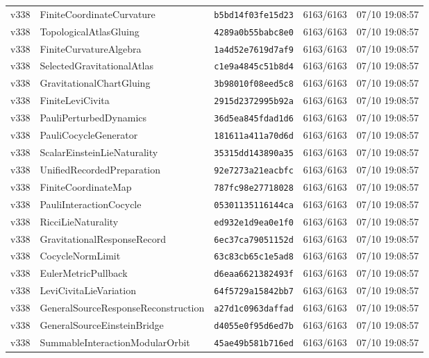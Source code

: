 \documentclass[11pt]{article}
\theoremstyle{definition}\newtheorem{deriv}{Derivação}
\begin{document}
{\begin{longtable}{@{}lllll@{}}
v338 & FiniteCoordinateCurvature & \texttt{b5bd14f03fe15d23} & 6163/6163 & 07/10 19:08:57 \\
v338 & TopologicalAtlasGluing & \texttt{4289a0b55babc8e0} & 6163/6163 & 07/10 19:08:57 \\
v338 & FiniteCurvatureAlgebra & \texttt{1a4d52e7619d7af9} & 6163/6163 & 07/10 19:08:57 \\
v338 & SelectedGravitationalAtlas & \texttt{c1e9a4845c51b8d4} & 6163/6163 & 07/10 19:08:57 \\
v338 & GravitationalChartGluing & \texttt{3b98010f08eed5c8} & 6163/6163 & 07/10 19:08:57 \\
v338 & FiniteLeviCivita & \texttt{2915d2372995b92a} & 6163/6163 & 07/10 19:08:57 \\
v338 & PauliPerturbedDynamics & \texttt{36d5ea845fdad1d6} & 6163/6163 & 07/10 19:08:57 \\
v338 & PauliCocycleGenerator & \texttt{181611a411a70d6d} & 6163/6163 & 07/10 19:08:57 \\
v338 & ScalarEinsteinLieNaturality & \texttt{35315dd143890a35} & 6163/6163 & 07/10 19:08:57 \\
v338 & UnifiedRecordedPreparation & \texttt{92e7273a21eacbfc} & 6163/6163 & 07/10 19:08:57 \\
v338 & FiniteCoordinateMap & \texttt{787fc98e27718028} & 6163/6163 & 07/10 19:08:57 \\
v338 & PauliInteractionCocycle & \texttt{05301135116144ca} & 6163/6163 & 07/10 19:08:57 \\
v338 & RicciLieNaturality & \texttt{ed932e1d9ea0e1f0} & 6163/6163 & 07/10 19:08:57 \\
v338 & GravitationalResponseRecord & \texttt{6ec37ca79051152d} & 6163/6163 & 07/10 19:08:57 \\
v338 & CocycleNormLimit & \texttt{63c83cb65c1e5ad8} & 6163/6163 & 07/10 19:08:57 \\
v338 & EulerMetricPullback & \texttt{d6eaa6621382493f} & 6163/6163 & 07/10 19:08:57 \\
v338 & LeviCivitaLieVariation & \texttt{64f5729a15842bb7} & 6163/6163 & 07/10 19:08:57 \\
v338 & GeneralSourceResponseReconstruction & \texttt{a27d1c0963daffad} & 6163/6163 & 07/10 19:08:57 \\
v338 & GeneralSourceEinsteinBridge & \texttt{d4055e0f95d6ed7b} & 6163/6163 & 07/10 19:08:57 \\
v338 & SummableInteractionModularOrbit & \texttt{45ae49b581b716ed} & 6163/6163 & 07/10 19:08:57 \\

\end{longtable}}
\end{document}
